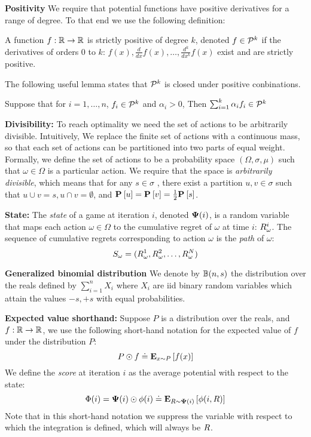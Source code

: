 \documentclass{article}[12pt]
\begin{document}
{\bf Positivity}
We require that potential functions have positive derivatives for a
range of degree. To that end we use the following definition:
\begin{definition}
A function $f:\reals \to \reals$ is strictly positive of degree $k$, 
denoted $f \in \SP{k}$ if the derivatives of orders 0 to $k$:  
$f(x), \frac{d}{dx}f(x), \ldots, \frac{d^k}{dx^k}f(x)$ exist and are strictly positive.
\end{definition}
The following useful lemma states that $\SP{k}$ is closed under positive conbinations.
\begin{lemma}  \label{lemma:SP-pos-comb}
  Suppose that for $i =1,\ldots,n$, $f_i \in \SP{k}$ and $\alpha_i>0$,
  Then $\sum_{i=1}^k \alpha_i f_i \in \SP{k}$
\end{lemma}


{\bf Divisibility:} To reach optimality we need the set of actions to
be arbitrarily divisible. Intuitively, We replace the finite set of
actions with a continuous mass, so that each set of actions can be
partitioned into two parts of equal weight.  Formally, we define the
set of actions to be a probability space $(\Omega,\sigma,\mu)$ such
that $\omega \in \Omega$ is a particular action. We require that the
space is {\em arbitrarily divisible}, which means that for any
$s \in \sigma$ , there exist a partition $u,v \in \sigma$ such that
$u \cup v = s, u \cap v = \emptyset$, and
$\P{}{u}=\P{}{v}=\frac{1}{2} \P{}{s}$.

{\bf State:} The {\em state} of a game at iteration $i$, denoted $\state(i)$, is
a random variable that maps each action $\omega \in \Omega$ to the
cumulative regret of $\omega$ at time $i$: $\R_\omega^i$. The sequence
of cumulative regrets corresponding to action $\omega$ is the {\em
  path} of $\omega$:
\begin{equation} \label{eqn:path}
  S_{\omega}=(\R_\omega^1,\R_\omega^2,\ldots,\R_\omega^N)
\end{equation}

{\bf  Generalized binomial distribution}
We denote by $\Binom(n,s)$ the distribution over the reals defined by
$\sum_{i=1}^n X_i$ where $X_i$ are iid binary random variables which
attain the values $-s,+s$ with equal probabilities.

{\bf Expected value shorthand:} Suppose $P$ is a distribution over the reals, and $f:\reals
\to \reals$, we use the following short-hand notation for the expected
value of $f$ under the distribution $P$:
\[ P \odot f \doteq \E{x \sim P}{f(x)}  \]
We define the {\em score} at iteration $i$ as the average potential
with respect to the state:
\[ \score(i) = \state(i) \odot \pot(i) \doteq \E{\R \sim \state(i)}{\pot(i,\R)}\]
Note that in this short-hand notation we suppress the variable with
respect to which the integration is defined, which will always be $\R$.
\end{document}
